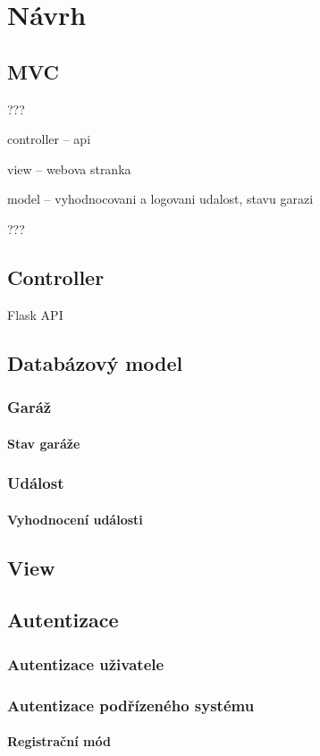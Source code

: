 \chapter{Návrh}
\label{sec:de}

\section{MVC}

???

controller -- api

view -- webova stranka

model -- vyhodnocovani a logovani udalost, stavu garazi

???

\section{Controller}

Flask API

\section{Databázový model}

\subsection{Garáž}

\subsubsection{Stav garáže}

\subsection{Událost}

\subsubsection{Vyhodnocení události}

\section{View}

\section{Autentizace}

\subsection{Autentizace uživatele}

\subsection{Autentizace podřízeného systému}

\subsubsection{Registrační mód}

